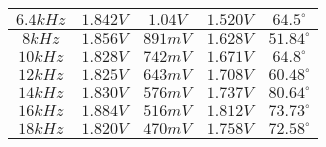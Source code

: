 \documentclass[polish,polish,a4paper]{article}
\begin{document}
\begin{figure}[H]
\begin{tabular}{|c|c|c|c|c|}
$6.4 kHz$                         & $1.842 V$                                                                       & $1.04 V$                                                         & $1.520 V$                     & $64.5 ^{\circ}$                                                                                                                    \\ \hline
$8 kHz$                           & $1.856 V$                                                                       & $891 mV$                                                                 & $1.628 V$             & $51.84 ^{\circ}$                                                                                                                   \\ \hline
$10 kHz$                          & $1.828 V$                                                                       & $742 mV$                                                                      & $1.671 V$        & $64.8 ^{\circ}$                                                                                                                    \\ \hline
$12 kHz$                          & $1.825 V$                                                                       & $643 mV$                                                                     & $1.708 V$         & $60.48 ^{\circ}$                                                                                                                   \\ \hline
$14 kHz$                          & $1.830 V$                                                                       & $576 mV$                                                                   & $1.737 V$           & $80.64 ^{\circ}$                                                                                                                   \\ \hline
$16 kHz$                          & $1.884 V$                                                                       & $516 mV$                                                                 & $1.812 V$             & $73.73 ^{\circ}$                                                                                                                   \\ \hline
$18 kHz$                          & $1.820 V$                                                                       & $470 mV$                                                                 & $1.758 V$             & $72.58 ^{\circ}$                                                                                                                   \\ \hline

\end{tabular}
\end{figure}
\end{document}

